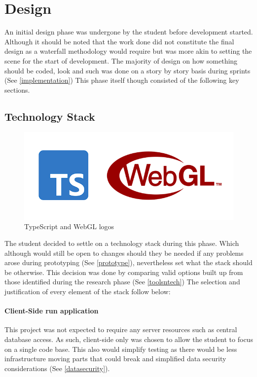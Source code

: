 \section{Design}
An initial design phase was undergone by the student before development started. Although it should be noted that the work done did not constitute the final design as a waterfall methodology would require but was more akin to setting the scene for the start of development. The majority of design on how something should be coded, look and such was done on a story by story basis during sprints (See \ref{implementation})
This phase itself though consisted of the following key sections.

\subsection{Technology Stack} \label{techstack}
\begin{figure}[h]
    \centering
    \includegraphics[width=1\columnwidth]{author-files/figures/logo-ts-webgl.PNG}
    \caption{TypeScript \cite[]{microsoft_2020_typescript} and WebGL logos \cite[]{khronosgroup_2017_the}}
    \label{fig:tswebgllogo}
\end{figure}
The student decided to settle on a technology stack during this phase. Which although would still be open to changes should they be needed if any problems arose during prototyping (See \ref{prototype}), nevertheless set what the stack should be otherwise. This decision was done by comparing valid options built up from those identified during the research phase (See \ref{toolsntech}) The selection and justification of every element of the stack follow below:

\paragraph{Client-Side run application}
This project was not expected to require any server resources such as central database access. As such, client-side only was chosen to allow the student to focus on a single code base. This also would simplify testing as there would be less infrastructure moving parts that could break and simplified data security considerations (See \ref{datasecurity}).

